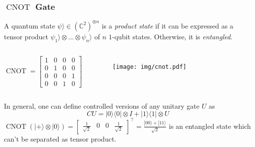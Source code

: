 \documentclass[UTF8,aspectratio=43,11pt,colorlinks,compress,openany]{beamer}%
\begin{document}
\begin{frame}\frametitle{$\operatorname{CNOT}$ Gate}
\begin{definition}
	A quantum state $\psi\rangle\in(\mathbb{C}^2)^{\otimes n}$ is a \emph{product state} if it can be expressed as a tensor product $\psi_1\rangle \otimes \dots \otimes \psi_n\rangle$ of $n$ $1$-qubit states. Otherwise, it is \emph{entangled}.
\end{definition}
\begin{columns}
\[\operatorname{CNOT}=
\begin{bmatrix}
	1&0&0&0\\
	0&1&0&0\\
	0&0&0&1\\
	0&0&1&0
\end{bmatrix}\]
	\begin{figure}[H]
		\texttt{[image: img/cnot.pdf]}
	\end{figure}
\end{columns}
	In general, one can define controlled versions of any unitary gate $U$ as
		\[CU=|0\rangle\langle 0|\otimes I+|1\rangle\langle 1|\otimes U\]
$\operatorname{CNOT}(|+\rangle\otimes|0\rangle)=
\begin{bmatrix}
	\frac{1}{\sqrt{2}}&0&0&\frac{1}{\sqrt{2}}
\end{bmatrix}^\top=\frac{|00\rangle+|11\rangle}{\sqrt{2}}$ is an entangled state which can't be separated as tensor product.
\end{frame}
\end{document}
